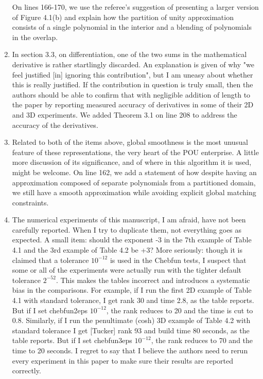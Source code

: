 \documentclass[10pt]{article}
\begin{document}
\begin{enumerate}
\begin{response}
On lines 166-170, we use the referee's suggestion of presenting a larger version of Figure 4.1(b) and explain how the partition of unity approximation consists of a single polynomial in the interior and a blending of polynomials in the overlap.
\end{response}

\item \begin{response}{In section 3.3, on differentiation, one of the
two sums in the mathematical derivative is rather
startlingly discarded. An explanation is given of why
"we feel justified [in] ignoring this contribution",
but I am uneasy about whether this is really justified.
If the contribution in question is truly small, then the
authors should be able to confirm that with negligible
addition of length to the paper by reporting measured
accuracy of derivatives in some of their 2D and 3D
experiments.}
We added Theorem 3.1 on line 208 to address the accuracy of the derivatives.
\end{response}

\item \begin{response}{Related to both of the items above, global smoothness is the most unusual feature of these representations, the very heart of the POU enterprise. A little more discussion
of its significance, and of where in this algorithm it is
used, might be welcome.}
On line 162, we add a statement of how despite having an approximation composed of separate polynomials from a partitioned domain, we still have a smooth approximation while avoiding explicit global matching constraints.
\end{response}

\item \begin{response}{The numerical experiments of this manuscript, I am afraid, have not been carefully reported. When I try
to duplicate them, not everything goes as expected.
A small item: should the exponent -3 in the 7th example
of Table 4.1 and the 3rd example of Table 4.2 be +3?
More seriously: though it is claimed that a tolerance
$10^{-12}$ is used in the Chebfun tests, I suspect that some or
all of the experiments were actually run with the tighter
default tolerance $2^{-52}$. This makes the tables incorrect
and introduces a systematic bias in the comparisons.
For example, if I run the first 2D example of Table 4.1
with standard tolerance, I get rank 30 and time 2.8, as the
table reports. But if I set chebfun2eps $10^{-12}$, the rank
reduces to 20 and the time is cut to 0.8. Similarly, if
I run the penultimate (cosh) 3D example of Table 4.2 with
standard tolerance I get [Tucker] rank 93 and build time 80
seconds, as the table reports. But if I set chebfun3eps
$10^{-12}$, the rank reduces to 70 and the time to 20 seconds.
I regret to say that I believe the authors need to rerun
every experiment in this paper to make sure their results
are reported correctly.}


\end{response}
\end{enumerate}
\end{document}
